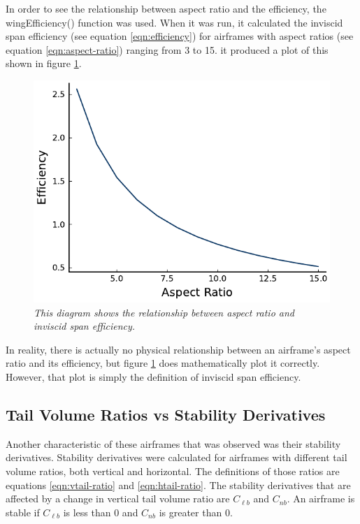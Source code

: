\documentclass{journal}
\begin{document}
	In order to see the relationship between aspect ratio and the efficiency, the wingEfficiency() function was used. When it was run, it calculated the inviscid span efficiency (see equation \ref{eqn:efficiency}) for airframes with aspect ratios (see equation \ref{eqn:aspect-ratio}) ranging from 3 to 15. it produced a plot of this shown in figure \ref{fig:efficiency}. \\
	
	\begin{figure}
		\centering
		\includegraphics{../graphics/efficiency.pdf}
		\caption{\emph{This diagram shows the relationship between aspect ratio and inviscid span efficiency.}}
		\label{fig:efficiency}
	\end{figure}

	In reality, there is actually no physical relationship between an airframe's aspect ratio and its efficiency, but figure \ref{fig:efficiency} does mathematically plot it correctly. However, that plot is simply the definition of inviscid span efficiency. \\
	
	\subsection{Tail Volume Ratios vs Stability Derivatives}
	
	Another characteristic of these airframes that was observed was their stability derivatives. Stability derivatives were calculated for airframes with different tail volume ratios, both vertical and horizontal. The definitions of those ratios are equations \ref{eqn:vtail-ratio} and \ref{eqn:htail-ratio}. The stability derivatives that are affected by a change in vertical tail volume ratio are \(C_{\ell{b}}\) and \(C_{nb}\). An airframe is stable if \(C_{\ell{b}}\) is less than 0 and \(C_{nb}\) is greater than 0. \\
	
\end{document}

